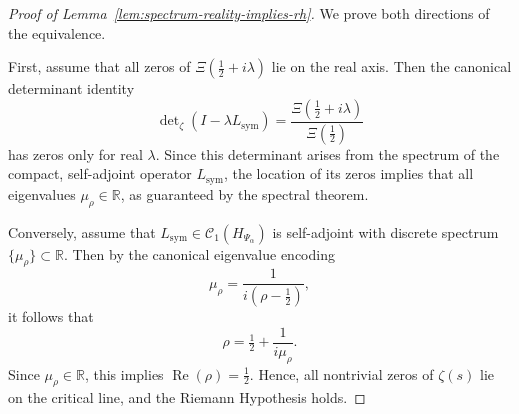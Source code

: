 \begin{proof}[Proof of Lemma~\ref{lem:spectrum-reality-implies-rh}]
We prove both directions of the equivalence.

First, assume that all zeros of \( \Xi(\tfrac{1}{2} + i\lambda) \) lie on the real axis. Then the canonical determinant identity
\[
\det\nolimits_\zeta(I - \lambda L_{\mathrm{sym}}) = \frac{\Xi(\tfrac{1}{2} + i\lambda)}{\Xi(\tfrac{1}{2})}
\]
has zeros only for real \( \lambda \). Since this determinant arises from the spectrum of the compact, self-adjoint operator \( L_{\mathrm{sym}} \), the location of its zeros implies that all eigenvalues \( \mu_\rho \in \mathbb{R} \), as guaranteed by the spectral theorem.

Conversely, assume that \( L_{\mathrm{sym}} \in \mathcal{C}_1(H_{\Psi_\alpha}) \) is self-adjoint with discrete spectrum \( \{\mu_\rho\} \subset \mathbb{R} \). Then by the canonical eigenvalue encoding
\[
\mu_\rho = \frac{1}{i(\rho - \tfrac{1}{2})},
\]
it follows that
\[
\rho = \tfrac{1}{2} + \frac{1}{i\mu_\rho}.
\]
Since \( \mu_\rho \in \mathbb{R} \), this implies \( \operatorname{Re}(\rho) = \tfrac{1}{2} \). Hence, all nontrivial zeros of \( \zeta(s) \) lie on the critical line, and the Riemann Hypothesis holds.
\end{proof}
%  